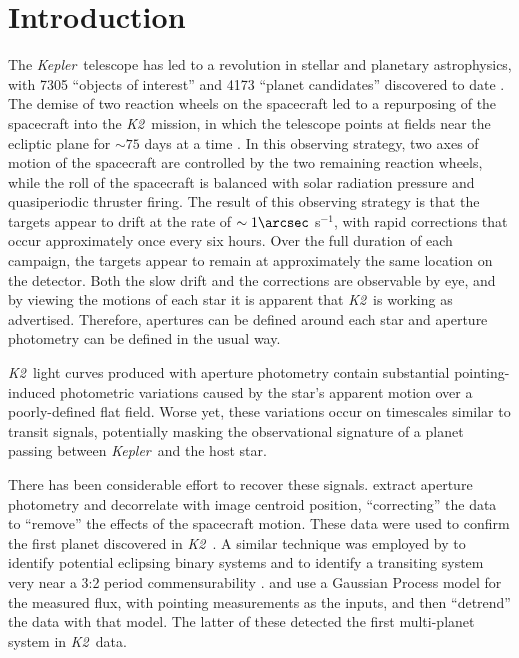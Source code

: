 \documentclass{emulateapj}
\newcommand{\project}[1]{\textsl{#1}}
\newcommand{\kep}{\project{Kepler}}
\newcommand{\KT}{\project{K2}}
\begin{document}
\section{Introduction}
The \kep\ telescope \citep{Borucki10} has led to a revolution in stellar and planetary 
astrophysics, with 7305 ``objects of interest'' and 4173 ``planet candidates''
discovered to date \citep{Borucki11a, Borucki11b, Batalha13, Burke14, Rowe15, Mullaly15}.
The demise of two reaction wheels on the spacecraft led to a repurposing 
of the spacecraft into the \KT\ mission, in which the telescope points at
fields near the ecliptic plane for $\sim 75$ days at a time \citep{Howell14}.
In this observing strategy, two axes of motion of the spacecraft are 
controlled by the two remaining reaction wheels, while the roll of the 
spacecraft is balanced with solar radiation pressure and quasiperiodic 
thruster firing.
The result of this observing strategy is that the targets appear to drift
at the rate of $\sim 1\arcsec$ s$^{-1}$, with rapid corrections that occur
approximately once every six hours.
Over the full duration of each campaign, the targets appear to remain at 
approximately the same location on the detector.
Both the slow drift and the corrections are observable by eye, and by viewing the
motions of each star \citep{Barentsen15} it is apparent that \KT\ is working as 
advertised.
Therefore, apertures can be defined around each star and aperture photometry can be
defined in the usual way.

\KT\ light curves produced with aperture photometry contain substantial pointing-induced
photometric variations caused by the star's apparent motion over a poorly-defined flat 
field. 
Worse yet, these variations occur on timescales similar to transit signals, potentially
masking the observational signature of a planet passing between \kep\ and the host star.

There has been considerable effort to recover these signals.
\citet{Vanderburg14} extract aperture photometry and decorrelate with image centroid
position, ``correcting'' the data to ``remove'' the effects of the spacecraft motion.
These data were used to confirm the first planet discovered in \KT\ \citep{Vanderburg15}.
A similar technique was employed by \citet{Armstrong15a} to identify potential eclipsing
binary systems and to identify a transiting system very near a 3:2 period commensurability
\citep{Armstrong15b}.
\citet{Aigrain15} and \citet{Crossfield15} use a Gaussian Process model for the measured
flux, with pointing measurements as the inputs, and then “detrend” the data with that model.
The latter of these detected the first multi-planet system in \KT\ data.
\end{document}
